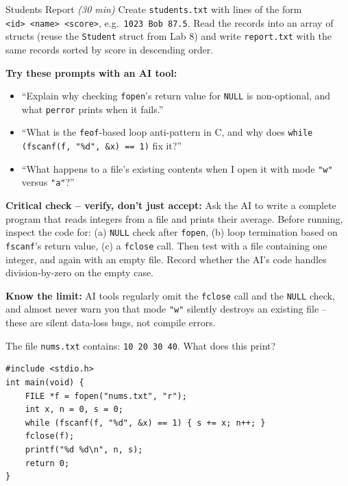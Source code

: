 \documentclass[11pt]{article}
\begin{document}
\begin{labexercise}{Students Report \hfill {\small \itshape (30 min)}}
Create \texttt{students.txt} with lines of the form\\
\texttt{<id> <name> <score>}, e.g.\ \texttt{1023 Bob 87.5}.
Read the records into an array of structs (reuse the \texttt{Student} struct from Lab 8)
and write \texttt{report.txt} with the same records sorted by score in descending order.
\end{labexercise}

\begin{aicollab}
\textbf{Try these prompts with an AI tool:}
\begin{itemize}[leftmargin=*,nosep]
  \item ``Explain why checking \texttt{fopen}'s return value for \texttt{NULL} is
        non-optional, and what \texttt{perror} prints when it fails.''
  \item ``What is the \texttt{feof}-based loop anti-pattern in C, and why does
        \texttt{while (fscanf(f, "\%d", \&x) == 1)} fix it?''
  \item ``What happens to a file's existing contents when I open it with mode
        \texttt{"w"} versus \texttt{"a"}?''
\end{itemize}

\medskip\textbf{Critical check -- verify, don't just accept:}
Ask the AI to write a complete program that reads integers from a file and prints their
average. Before running, inspect the code for:
(a) \texttt{NULL} check after \texttt{fopen},
(b) loop termination based on \texttt{fscanf}'s return value,
(c) a \texttt{fclose} call.
Then test with a file containing one integer, and again with an empty file. Record
whether the AI's code handles division-by-zero on the empty case.

\medskip\textbf{Know the limit:}
AI tools regularly omit the \texttt{fclose} call and the \texttt{NULL} check, and almost
never warn you that mode \texttt{"w"} silently destroys an existing file -- these are
silent data-loss bugs, not compile errors.
\end{aicollab}

\takehomebanner

\begin{trace}
The file \texttt{nums.txt} contains: \texttt{10 20 30 40}. What does this print?
\begin{lstlisting}
#include <stdio.h>
int main(void) {
    FILE *f = fopen("nums.txt", "r");
    int x, n = 0, s = 0;
    while (fscanf(f, "%d", &x) == 1) { s += x; n++; }
    fclose(f);
    printf("%d %d\n", n, s);
    return 0;
}
\end{lstlisting}
\end{trace}
\end{document}
